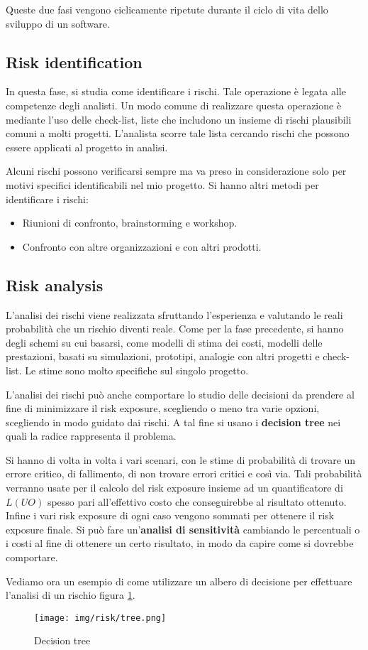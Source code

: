 Queste due fasi vengono ciclicamente ripetute durante il ciclo di vita dello sviluppo di un software.
\subsection{Risk identification}
In questa fase, si studia come identificare i rischi. Tale operazione è legata
alle competenze degli analisti. Un modo comune di realizzare questa operazione è
mediante l'uso delle check-list, liste che includono un insieme di rischi plausibili
comuni a molti progetti. L'analista scorre tale lista cercando rischi che possono
essere applicati al progetto in analisi.

Alcuni rischi possono verificarsi sempre ma va preso in considerazione solo per
motivi specifici identificabili nel mio progetto. Si hanno altri metodi per identificare i rischi:
\begin{itemize}
    \item Riunioni di confronto, brainstorming e workshop.
    \item Confronto con altre organizzazioni e con altri prodotti.
\end{itemize}
\subsection{Risk analysis}
L'analisi dei rischi viene realizzata sfruttando l'esperienza e valutando le
reali probabilità che un rischio diventi reale. Come per la fase precedente, si
hanno degli schemi su cui basarsi, come modelli di stima dei costi, modelli delle
prestazioni, basati su simulazioni, prototipi, analogie con altri progetti e
check-list. Le stime sono molto specifiche sul singolo progetto.

L'analisi dei rischi può anche comportare lo studio delle decisioni da prendere
al fine di minimizzare il risk exposure, scegliendo o meno tra varie opzioni,
scegliendo in modo guidato dai rischi. A tal fine si usano i \textbf{decision tree}
nei quali la radice rappresenta il problema.

Si hanno di volta in volta i vari scenari, con le stime di probabilità di trovare
un errore critico, di fallimento, di non trovare errori critici e così via. Tali
probabilità verranno usate per il calcolo del risk exposure insieme ad un
quantificatore di $L(UO)$ spesso pari all'effettivo costo che conseguirebbe al
risultato ottenuto. Infine i vari risk exposure di ogni caso vengono sommati per
ottenere il risk exposure finale. Si può fare un'\textbf{analisi di sensitività}
cambiando le percentuali o i costi al fine di ottenere un certo risultato, in
modo da capire come si dovrebbe comportare.
\begin{esempio}
    Vediamo ora un esempio di come utilizzare un albero di decisione per effettuare
    l'analisi di un rischio figura \ref{fig:tree}.
    \begin{figure}[!ht]
        \centering
        \texttt{[image: img/risk/tree.png]}
        \caption{Decision tree}
        \label{fig:tree}
    \end{figure}
\end{esempio}

